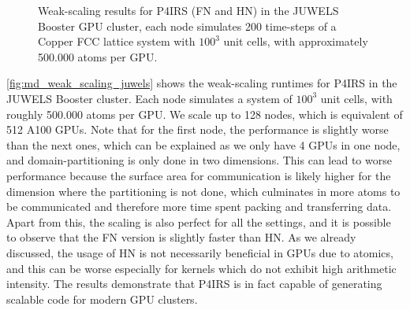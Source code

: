\documentclass[preprint,12pt]{elsarticle}
\begin{document}
\begin{figure}[t]
\centering
{}
\vspace{-3ex}
\caption{Weak-scaling results for P4IRS (FN and HN) in the JUWELS Booster GPU cluster, each node simulates 200 time-steps of a Copper FCC lattice system with $100^3$ unit cells, with approximately 500.000 atoms per GPU.}
\vspace{-2ex}
\label{fig:md_weak_scaling_juwels}
\end{figure}

\autoref{fig:md_weak_scaling_juwels} shows the weak-scaling runtimes for P4IRS in the JUWELS Booster cluster.
Each node simulates a system of $100^3$ unit cells, with roughly 500.000 atoms per GPU.
We scale up to 128 nodes, which is equivalent of 512 A100 GPUs.
Note that for the first node, the performance is slightly worse than the next ones, which can be explained as we only have 4 GPUs in one node, and domain-partitioning is only done in two dimensions.
This can lead to worse performance because the surface area for communication is likely higher for the dimension where the partitioning is not done, which culminates in more atoms to be communicated and therefore more time spent packing and transferring data.
Apart from this, the scaling is also perfect for all the settings, and it is possible to observe that the \ac{FN} version is slightly faster than \ac{HN}.
As we already discussed, the usage of \ac{HN} is not necessarily beneficial in GPUs due to atomics, and this can be worse especially for kernels which do not exhibit high arithmetic intensity.
The results demonstrate that P4IRS is in fact capable of generating scalable code for modern GPU clusters.
\end{document}
